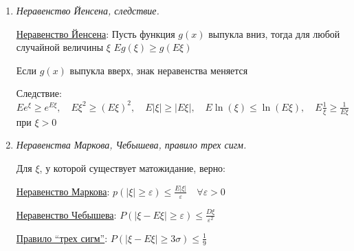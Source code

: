 \begin{enumerate}
    \hyperlink{expectedvalueoftransformedvariable}{Матожидание}: \Ths Если $\xi$ -- дискретная случайная величина, то $Eg(\xi) = \sum_{i = 1}^\infty g(x_i) \cdot p(\xi = x_i)$

    Для непрерывной случайной величины $Eg(\xi) = \int_{-\infty}^{\infty} g(x) f_\xi(x) dx$

    \hyperlink{momentsproperties}{Свойства моментов}:
    
    \begin{enumerate}
        \item Если $\xi \geq 0$, то $E\xi \geq 0$

        \item Если $\xi \leq \eta$, то $E\xi \leq E\eta$

        \item Если $|\xi| \leq |\eta|$, то $E|\xi|^k \leq E|\eta|^k$

        \item Если существует момент $m_t$ случайной величины $\xi$, то существует $m_s$ при $s < t$ (при условии, что интеграл/сумма сходятся)
    \end{enumerate}

    
    \item \textit{Неравенство Йенсена, следствие.}

    \hyperlink{jensensinequality}{Неравенство Йенсена}: \Ths Пусть функция $g(x)$ выпукла вниз, тогда для любой случайной величины $\xi$ $Eg(\xi) \geq g(E\xi)$

    \Nota Если $g(x)$ выпукла вверх, знак неравенства меняется

    Следствие: $Ee^\xi \geq e^{E\xi}, \quad E\xi^2 \geq (E\xi)^2, \quad E|\xi| \geq |E\xi|, \quad E\ln(\xi) \leq \ln(E\xi), \quad E\frac{1}{\xi} \geq \frac{1}{E\xi}$ при $\xi > 0$

    \item \textit{Неравенства Маркова, Чебышева, правило трех сигм.}

    Для $\xi$, у которой существует матожидание, верно: 

    \hyperlink{markovsinequality}{Неравенство Маркова}: \Ths $p(|\xi| \geq \varepsilon) \leq \frac{E|\xi|}{\varepsilon} \quad \forall \varepsilon > 0$
    
    \hyperlink{chebyshevsinequality}{Неравенство Чебышева}: \Ths $P(|\xi - E\xi| \geq \varepsilon) \leq \frac{D\xi}{\varepsilon^2}$
    
    \hyperlink{ruleofthreesigmas}{Правило \enquote{трех сигм}}: \Ths $P(|\xi - E\xi| \geq 3\sigma) \leq \frac{1}{9}$


\end{enumerate}
